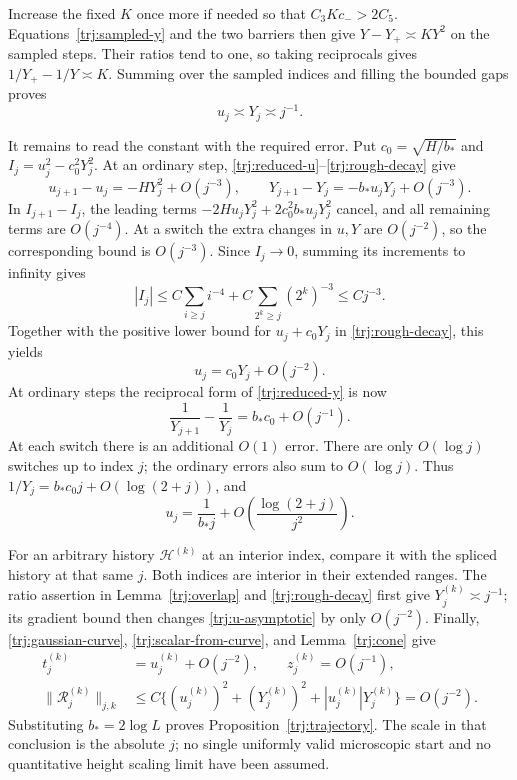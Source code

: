 Increase the fixed \(K\) once more if needed so that
\(C_3Kc_->2C_5\).  Equations~\eqref{trj:sampled-y} and the two barriers
then give \(Y-Y_+\asymp K Y^2\) on the sampled steps.  Their ratios
tend to one, so taking reciprocals gives
\(1/Y_+-1/Y\asymp K\).  Summing over the sampled indices and filling
the bounded gaps proves
\begin{equation}\label{trj:rough-decay}
                         u_j\asymp Y_j\asymp j^{-1}.
\end{equation}

It remains to read the constant with the required error.  Put
\(c_0=\sqrt{H/b_*}\) and \(I_j=u_j^2-c_0^2Y_j^2\).
At an ordinary step, \eqref{trj:reduced-u}--\eqref{trj:rough-decay}
give
\[
 u_{j+1}-u_j=-HY_j^2+O(j^{-3}),\qquad
 Y_{j+1}-Y_j=-b_*u_jY_j+O(j^{-3}).
\]
In \(I_{j+1}-I_j\), the leading terms
\(-2Hu_jY_j^2+2c_0^2b_*u_jY_j^2\) cancel, and all remaining terms are
\(O(j^{-4})\).  At a switch the extra changes in \(u,Y\) are
\(O(j^{-2})\), so the corresponding bound is \(O(j^{-3})\).
Since \(I_j\to0\), summing its increments to infinity gives
\[
 |I_j|\le C\sum_{i\ge j}i^{-4}
             +C\sum_{2^k\ge j}(2^k)^{-3}
          \le Cj^{-3}.
\]
Together with the positive lower bound for \(u_j+c_0Y_j\) in
\eqref{trj:rough-decay}, this yields
\begin{equation}\label{trj:separatrix-error}
                         u_j=c_0Y_j+O(j^{-2}).
\end{equation}
At ordinary steps the reciprocal form of \eqref{trj:reduced-y} is now
\[
 \frac1{Y_{j+1}}-\frac1{Y_j}=b_*c_0+O(j^{-1}).
\]
At each switch there is an additional \(O(1)\) error.  There are only
\(O(\log j)\) switches up to index \(j\); the ordinary errors also
sum to \(O(\log j)\).  Thus
\(1/Y_j=b_*c_0j+O(\log(2+j))\), and
\begin{equation}\label{trj:u-asymptotic}
                   u_j=\frac1{b_*j}
                       +O\!\left(\frac{\log(2+j)}{j^2}\right).
\end{equation}

For an arbitrary history \(\mathcal H^{(k)}\) at an interior index,
compare it with the spliced history at that same \(j\).  Both indices
are interior in their extended ranges.  The ratio assertion in
Lemma~\ref{trj:overlap} and \eqref{trj:rough-decay} first give
\(Y_j^{(k)}\asymp j^{-1}\); its gradient bound then changes
\eqref{trj:u-asymptotic} by only \(O(j^{-2})\).  Finally,
\eqref{trj:gaussian-curve}, \eqref{trj:scalar-from-curve}, and
Lemma~\ref{trj:cone} give
\begin{align*}
 t_j^{(k)}&=u_j^{(k)}+O(j^{-2}),\qquad z_j^{(k)}=O(j^{-1}),\\
 \|\mathcal R_j^{(k)}\|_{j,k}
  &\le C\{(u_j^{(k)})^2+(Y_j^{(k)})^2+|u_j^{(k)}|Y_j^{(k)}\}
  =O(j^{-2}).
\end{align*}
Substituting \(b_*=2\log L\) proves
Proposition~\ref{trj:trajectory}.  The scale in that conclusion is
the absolute \(j\); no single uniformly valid microscopic start and
no quantitative height scaling limit have been assumed.

